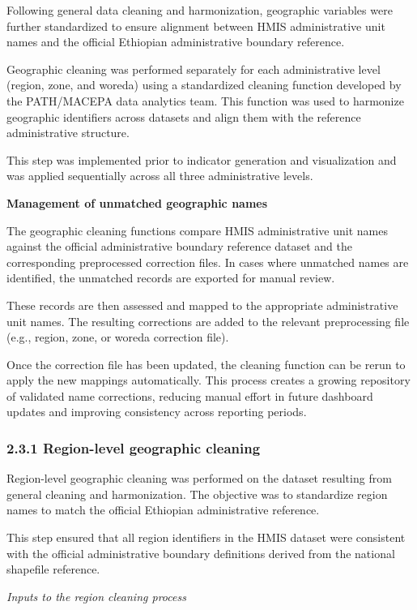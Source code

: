 \documentclass[
  letterpaper,
  DIV=11,
  numbers=noendperiod]{scrartcl}
\begin{document}
Following general data cleaning and harmonization, geographic variables
were further standardized to ensure alignment between HMIS
administrative unit names and the official Ethiopian administrative
boundary reference.

Geographic cleaning was performed separately for each administrative
level (region, zone, and woreda) using a standardized cleaning function
developed by the PATH/MACEPA data analytics team. This function was used
to harmonize geographic identifiers across datasets and align them with
the reference administrative structure.

This step was implemented prior to indicator generation and
visualization and was applied sequentially across all three
administrative levels.

\textbf{Management of unmatched geographic names}

The geographic cleaning functions compare HMIS administrative unit names
against the official administrative boundary reference dataset and the
corresponding preprocessed correction files. In cases where unmatched
names are identified, the unmatched records are exported for manual
review.

These records are then assessed and mapped to the appropriate
administrative unit names. The resulting corrections are added to the
relevant preprocessing file (e.g., region, zone, or woreda correction
file).

Once the correction file has been updated, the cleaning function can be
rerun to apply the new mappings automatically. This process creates a
growing repository of validated name corrections, reducing manual effort
in future dashboard updates and improving consistency across reporting
periods.

\subsubsection{2.3.1 Region-level geographic
cleaning}\label{region-level-geographic-cleaning}

Region-level geographic cleaning was performed on the dataset resulting
from general cleaning and harmonization. The objective was to
standardize region names to match the official Ethiopian administrative
reference.

This step ensured that all region identifiers in the HMIS dataset were
consistent with the official administrative boundary definitions derived
from the national shapefile reference.

\emph{Inputs to the region cleaning process}
\end{document}

